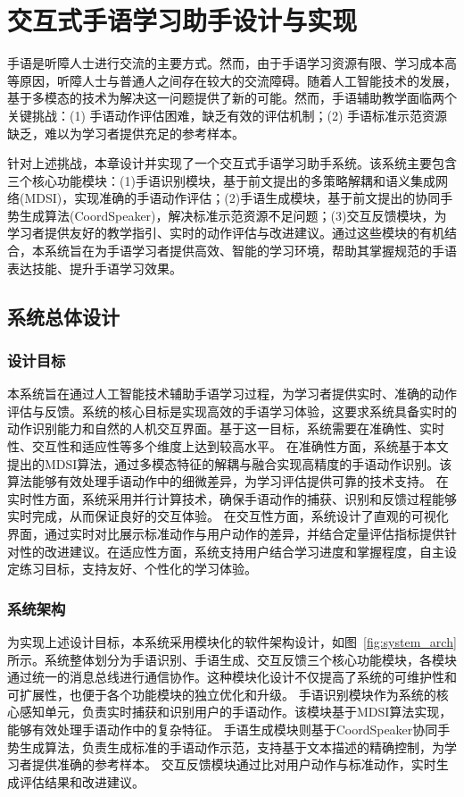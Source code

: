 
\chapter{交互式手语学习助手设计与实现}
手语是听障人士进行交流的主要方式。然而，由于手语学习资源有限、学习成本高等原因，听障人士与普通人之间存在较大的交流障碍。随着人工智能技术的发展，基于多模态的技术为解决这一问题提供了新的可能。然而，手语辅助教学面临两个关键挑战：(1) 手语动作评估困难，缺乏有效的评估机制；(2) 手语标准示范资源缺乏，难以为学习者提供充足的参考样本。

针对上述挑战，本章设计并实现了一个交互式手语学习助手系统。该系统主要包含三个核心功能模块：(1)手语识别模块，基于前文提出的多策略解耦和语义集成网络(MDSI)，实现准确的手语动作评估；(2)手语生成模块，基于前文提出的协同手势生成算法(CoordSpeaker)，解决标准示范资源不足问题；(3)交互反馈模块，为学习者提供友好的教学指引、实时的动作评估与改进建议。通过这些模块的有机结合，本系统旨在为手语学习者提供高效、智能的学习环境，帮助其掌握规范的手语表达技能、提升手语学习效果。

\section{系统总体设计}

\subsection{设计目标}
本系统旨在通过人工智能技术辅助手语学习过程，为学习者提供实时、准确的动作评估与反馈。系统的核心目标是实现高效的手语学习体验，这要求系统具备实时的动作识别能力和自然的人机交互界面。基于这一目标，系统需要在准确性、实时性、交互性和适应性等多个维度上达到较高水平。
在准确性方面，系统基于本文提出的MDSI算法，通过多模态特征的解耦与融合实现高精度的手语动作识别。该算法能够有效处理手语动作中的细微差异，为学习评估提供可靠的技术支持。
在实时性方面，系统采用并行计算技术，确保手语动作的捕获、识别和反馈过程能够实时完成，从而保证良好的交互体验。
在交互性方面，系统设计了直观的可视化界面，通过实时对比展示标准动作与用户动作的差异，并结合定量评估指标提供针对性的改进建议。在适应性方面，系统支持用户结合学习进度和掌握程度，自主设定练习目标，支持友好、个性化的学习体验。

\subsection{系统架构}
为实现上述设计目标，本系统采用模块化的软件架构设计，如图~\ref{fig:system_arch}所示。系统整体划分为手语识别、手语生成、交互反馈三个核心功能模块，各模块通过统一的消息总线进行通信协作。这种模块化设计不仅提高了系统的可维护性和可扩展性，也便于各个功能模块的独立优化和升级。
手语识别模块作为系统的核心感知单元，负责实时捕获和识别用户的手语动作。该模块基于MDSI算法实现，能够有效处理手语动作中的复杂特征。
手语生成模块则基于CoordSpeaker协同手势生成算法，负责生成标准的手语动作示范，支持基于文本描述的精确控制，为学习者提供准确的参考样本。
交互反馈模块通过比对用户动作与标准动作，实时生成评估结果和改进建议。%


